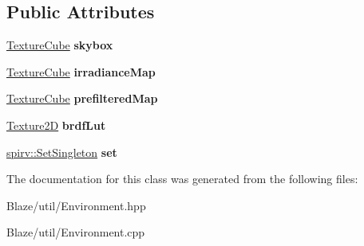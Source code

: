 \subsection*{Public Attributes}
\begin{DoxyCompactItemize}
\item 
\mbox{\label{classblaze_1_1util_1_1Environment_affa9b7f46e972eb0aaacd39aa4540429}} 
\hyperlink{classblaze_1_1TextureCube}{Texture\+Cube} {\bfseries skybox}
\item 
\mbox{\label{classblaze_1_1util_1_1Environment_ac275012db9cb9036002297de82d04ddd}} 
\hyperlink{classblaze_1_1TextureCube}{Texture\+Cube} {\bfseries irradiance\+Map}
\item 
\mbox{\label{classblaze_1_1util_1_1Environment_a9098a6f07ad08dd4cff1be808f3d5cc0}} 
\hyperlink{classblaze_1_1TextureCube}{Texture\+Cube} {\bfseries prefiltered\+Map}
\item 
\mbox{\label{classblaze_1_1util_1_1Environment_a749c7bf4dca2a7f7b62e6a755c506711}} 
\hyperlink{classblaze_1_1Texture2D}{Texture2D} {\bfseries brdf\+Lut}
\item 
\mbox{\label{classblaze_1_1util_1_1Environment_a6b5e65e31781f21763ab5afa7779f536}} 
\hyperlink{structblaze_1_1spirv_1_1SetSingleton}{spirv\+::\+Set\+Singleton} {\bfseries set}
\end{DoxyCompactItemize}


The documentation for this class was generated from the following files\+:\begin{DoxyCompactItemize}
\item 
Blaze/util/Environment.\+hpp\item 
Blaze/util/Environment.\+cpp\end{DoxyCompactItemize}
